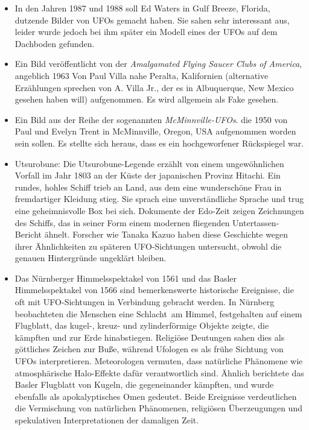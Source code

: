 \documentclass{scrartcl}
\begin{document}
\begin{itemize}
	\item In den Jahren 1987 und 1988 soll Ed Waters in Gulf Breeze, Florida, dutzende Bilder von UFOs gemacht haben. Sie sahen sehr interessant aus, leider wurde jedoch bei ihm später ein Modell eines der UFOs auf dem Dachboden gefunden.
	\item Ein Bild veröffentlicht von der \frq\textit{Amalgamated Flying Saucer Clubs of America}\flq, angeblich 1963 Von Paul Villa nahe Peralta, Kalifornien (alternative Erzählungen sprechen von A. Villa Jr., der es in Albuquerque, New Mexico gesehen haben will) aufgenommen. Es wird allgemein als Fake gesehen.
	\item Ein Bild aus der Reihe der sogenannten \textit{McMinnville-UFOs}. die 1950 von Paul und Evelyn Trent in McMinnville, Oregon, USA aufgenommen worden sein sollen. Es stellte sich heraus, dass es ein hochgeworfener Rückspiegel war.
	\item Utsurobune: Die Utsurobune-Legende erzählt von einem ungewöhnlichen Vorfall im Jahr 1803 an der Küste der japanischen Provinz Hitachi. Ein rundes, hohles Schiff trieb an Land, aus dem eine wunderschöne Frau in fremdartiger Kleidung stieg. Sie sprach eine unverständliche Sprache und trug eine geheimnisvolle Box bei sich. Dokumente der Edo-Zeit zeigen Zeichnungen des Schiffs, das in seiner Form einem modernen \frq fliegenden Untertassen\flq-Bericht ähnelt. Forscher wie Tanaka Kazuo haben diese Geschichte wegen ihrer Ähnlichkeiten zu späteren UFO-Sichtungen untersucht, obwohl die genauen Hintergründe ungeklärt bleiben. 
	\item Das Nürnberger Himmelsspektakel von 1561 und das Basler Himmelsspektakel von 1566 sind bemerkenswerte historische Ereignisse, die oft mit UFO-Sichtungen in Verbindung gebracht werden. In Nürnberg beobachteten die Menschen eine \frq Schlacht\flq\ am Himmel, festgehalten auf einem Flugblatt, das kugel-, kreuz- und zylinderförmige Objekte zeigte, die kämpften und zur Erde hinabstiegen. Religiöse Deutungen sahen dies als göttliches Zeichen zur Buße, während Ufologen es als frühe Sichtung von UFOs interpretieren. Meteorologen vermuten, dass natürliche Phänomene wie atmosphärische Halo-Effekte dafür verantwortlich sind. Ähnlich berichtete das Basler Flugblatt von Kugeln, die gegeneinander \frq kämpften\flq, und wurde ebenfalls als apokalyptisches Omen gedeutet. Beide Ereignisse verdeutlichen die Vermischung von natürlichen Phänomenen, religiösen Überzeugungen und spekulativen Interpretationen der damaligen Zeit.  

\end{itemize}
\end{document}
